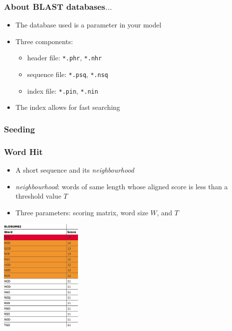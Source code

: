 \documentclass[table]{beamer}
\begin{document}
  \begin{frame}
    \frametitle{About BLAST databases$\ldots$}
    \begin{itemize}
      \item The database used is a parameter in your model
      \item Three components:
      \begin{itemize}
        \item header file: \texttt{*.phr}, \texttt{*.nhr}
        \item sequence file: \texttt{*.psq}, \texttt{*.nsq}
        \item index file: \texttt{*.pin}, \texttt{*.nin}
      \end{itemize}
      \item The index allows for fast searching                
    \end{itemize}
  \end{frame}

  \subsubsection{Seeding}
  \begin{frame}
    \frametitle{Word Hit}
    \begin{itemize}
      \item A short sequence and its \emph{neighbourhood}
      \item \emph{neighbourhood}: words of same length whose aligned score is less than a threshold value $T$
      \item Three parameters: scoring matrix, word size $W$, and $T$
    \end{itemize}
    \begin{center}
      \includegraphics[width=0.3\textwidth]{images/neighbourhood} 
    \end{center}    
  \end{frame}
\end{document}
